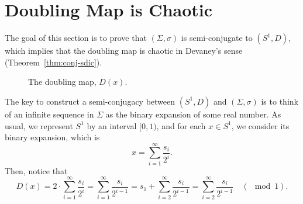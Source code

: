 \documentclass[10pt,twoside]{book}
\begin{document}

\section{Doubling Map is Chaotic}
The goal of this section is to prove that $(\Sigma, \sigma)$ is semi-conjugate to $(S^1, D)$, which implies that the doubling map is chaotic in Devaney's sense (Theorem~\ref{thm:conj-sdic}).
\begin{center}
\end{center}
\begin{figure}[ht]
  \centering
  \label{fig:doubling}
  \caption{The doubling map, $D(x)$.}
\end{figure}
The key to construct a semi-conjugacy between $(S^1,D)$ and $(\Sigma, \sigma)$ is to think of an infinite sequence in $\Sigma$ as the binary expansion of some real number.
As usual, we represent $S^1$ by an interval $[0,1)$, and for each $x \in S^1$, we consider its binary expansion, which is %
\begin{equation*}
  x = \sum\limits_{i = 1}^{\infty} \frac{s_i}{2^i}.
\end{equation*}
Then, notice that
\begin{equation*}
  D(x) = 2 \cdot \sum\limits_{i = 1}^{\infty} \frac{s_i}{2^i}
  = \sum\limits_{i = 1}^{\infty} \frac{s_i}{2^{i-1}}
  = s_1 + \sum\limits_{i = 2}^{\infty} \frac{s_i}{2^{i-1}}
  = \sum\limits_{i = 2}^{\infty} \frac{s_i}{2^{i-1}}
  \quad(\mod{1}).
\end{equation*}
\end{document}
